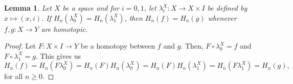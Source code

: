 \documentclass[10pt]{article}
\theoremstyle{thmstyle}
\newtheorem{lemma}[theorem]{Lemma}
\theoremstyle{defstyle}
\renewcommand{\ge}{\geqslant}
\begin{document}
\begin{lemma}
    Let $X$ be a space and for $i = 0, 1$, let $\lambda^X_i: X\to X\times I$ be defined by $x\mapsto(x, i)$. If $H_n(\lambda^X_0) = H_n(\lambda^X_1)$, then $H_n(f) = H_n(g)$ whenever $f,g: X\to Y$ are homotopic.
\end{lemma}
\begin{proof}
    Let $F: X\times I\to Y$ be a homotopy between $f$ and $g$. Then, $F\circ\lambda^X_0 = f$ and $F\circ\lambda^X_1 = g$. This gives us 
    \begin{equation*}
        H_n(f) = H_n(F\lambda_0^X) = H_n(F)H_n(\lambda^X_0) = H_n(F)H_n(\lambda^X_1) = H_n(F\lambda^X_1) = H_n(g),
    \end{equation*}
    for all $n\ge 0$.
\end{proof}
\end{document}
